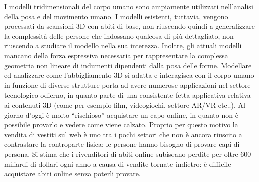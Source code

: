 \medskip

I modelli tridimensionali del corpo umano sono ampiamente utilizzati
nell'analisi della posa e del movimento umano. I modelli esistenti, tuttavia, vengono processati da scansioni 3D con abiti di base, non riuscendo quindi a generalizzare la complessità delle persone che indossano qualcosa di più dettagliato, non riuscendo a studiare il modello nella sua interezza.
Inoltre, gli attuali modelli mancano della forza espressiva necessaria per rappresentare la complessa geometria non lineare di indumenti dipendenti dalla posa delle forme. 
Modellare ed analizzare come l’abbigliamento 3D si adatta e interagisca con il corpo umano in funzione di diverse strutture porta ad avere numerose applicazioni nel settore tecnologico odierno, in quanto parte di una consistente fetta applicativa relativa ai contenuti 3D (come per esempio film, videogiochi, settore AR/VR etc..).
Al giorno d’oggi è molto “rischioso” acquistare un capo online, in quanto non è possibile provarlo e vedere come viene calzato.
Proprio per questo motivo la vendita di vestiti sul web è uno tra i pochi settori che non è ancora riuscito a contrastare la controparte fisica: le persone hanno bisogno di provare capi di persona.
Si stima che i rivenditori di abiti online subiscano perdite per oltre 600 miliardi di dollari ogni anno a causa  di vendite tornate indietro: è difficile acquistare abiti online senza poterli provare.